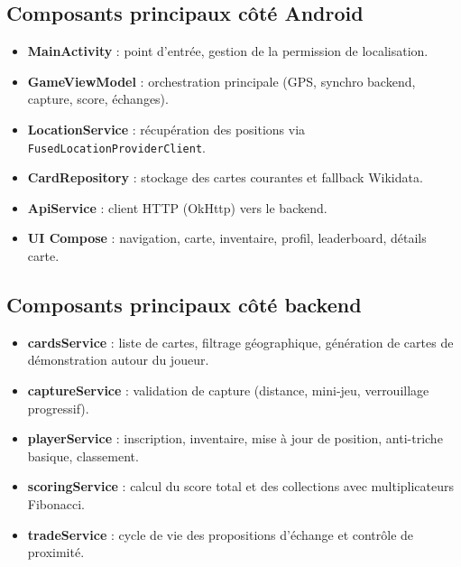\documentclass[11pt,a4paper]{article}
\begin{document}
\subsection{Composants principaux côté Android}
\begin{itemize}[leftmargin=1.2cm]
  \item \textbf{MainActivity} : point d'entrée, gestion de la permission de localisation.
  \item \textbf{GameViewModel} : orchestration principale (GPS, synchro backend, capture, score, échanges).
  \item \textbf{LocationService} : récupération des positions via \texttt{FusedLocationProviderClient}.
  \item \textbf{CardRepository} : stockage des cartes courantes et fallback Wikidata.
  \item \textbf{ApiService} : client HTTP (OkHttp) vers le backend.
  \item \textbf{UI Compose} : navigation, carte, inventaire, profil, leaderboard, détails carte.
\end{itemize}

\subsection{Composants principaux côté backend}
\begin{itemize}[leftmargin=1.2cm]
  \item \textbf{cardsService} : liste de cartes, filtrage géographique, génération de cartes de démonstration autour du joueur.
  \item \textbf{captureService} : validation de capture (distance, mini-jeu, verrouillage progressif).
  \item \textbf{playerService} : inscription, inventaire, mise à jour de position, anti-triche basique, classement.
  \item \textbf{scoringService} : calcul du score total et des collections avec multiplicateurs Fibonacci.
  \item \textbf{tradeService} : cycle de vie des propositions d'échange et contrôle de proximité.
\end{itemize}
\end{document}
